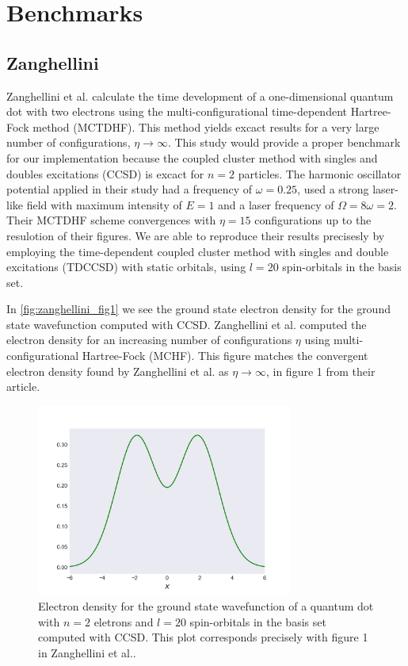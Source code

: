 \chapter{Benchmarks}

\section{Zanghellini}

Zanghellini et al.\cite{Zanghellini04} calculate the time development of a 
one-dimensional quantum dot with two electrons using the multi-configurational 
time-dependent Hartree-Fock method (MCTDHF). This method yields excact results for 
a very large number of configurations, $\eta \to \infty$. This study would provide a 
proper benchmark for our implementation because the coupled cluster method with singles and 
doubles excitations (CCSD) is excact for $n=2$ particles. 
The harmonic oscillator potential applied in
their study had a frequency of $\omega=0.25$, used a strong laser-like field with 
maximum intensity of $E = 1$ and a laser frequency of $\Omega = 8 \omega = 2$.
Their MCTDHF scheme convergences with $\eta=15$
configurations up to the resulotion of their figures.
We are able to reproduce their results precisesly by employing the 
time-dependent coupled cluster method with singles and double excitations (TDCCSD) with 
static orbitals, using $l=20$ spin-orbitals in the basis set.

In \autoref{fig:zanghellini_fig1} we see the ground state electron density for the 
ground state wavefunction computed with CCSD. Zanghellini et al. computed the electron
density for an increasing number of configurations $\eta$ using multi-configurational
Hartree-Fock (MCHF). This figure matches the convergent electron density found by Zanghellini et al. 
as $\eta \to \infty$, in figure 1 from their article. 

\begin{figure}
    \centering
    \includegraphics[width=0.75\textwidth]{results/figures/zanghellini_fig1.png}
    \caption{
        \label{fig:zanghellini_fig1}
        Electron density for the ground state wavefunction of a quantum dot with 
        $n=2$ eletrons and $l=20$ spin-orbitals in the basis set computed with
        CCSD. This plot 
        corresponds precisely with figure 1 in Zanghellini et al.\cite{Zanghellini04}.
    }
\end{figure}

